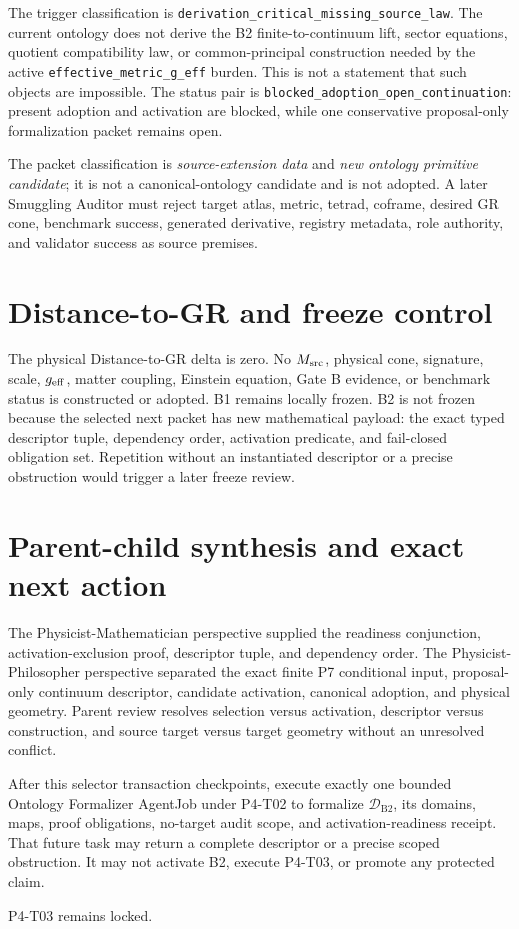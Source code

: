 \documentclass[11pt]{article}
\newcommand{\Btwo}{\mathrm{B2}}
\newcommand{\Desc}{\mathcal{D}_{\Btwo}}
\begin{document}
The trigger classification is
\texttt{derivation\_critical\_missing\_source\_law}. The current ontology
does not derive the B2 finite-to-continuum lift, sector equations, quotient
compatibility law, or common-principal construction needed by the active
\texttt{effective\_metric\_g\_eff} burden. This is not a statement that such
objects are impossible. The status pair is
\texttt{blocked\_adoption\_open\_continuation}: present adoption and
activation are blocked, while one conservative proposal-only formalization
packet remains open.

The packet classification is \emph{source-extension data} and
\emph{new ontology primitive candidate}; it is not a canonical-ontology
candidate and is not adopted. A later Smuggling Auditor must reject target
atlas, metric, tetrad, coframe, desired GR cone, benchmark success, generated
derivative, registry metadata, role authority, and validator success as
source premises.

\section{Distance-to-GR and freeze control}

The physical Distance-to-GR delta is zero. No $M_{\rm src}$, physical cone,
signature, scale, $g_{\rm eff}$, matter coupling, Einstein equation, Gate B
evidence, or benchmark status is constructed or adopted. B1 remains locally
frozen. B2 is not frozen because the selected next packet has new mathematical
payload: the exact typed descriptor tuple, dependency order, activation
predicate, and fail-closed obligation set. Repetition without an instantiated
descriptor or a precise obstruction would trigger a later freeze review.

\section{Parent-child synthesis and exact next action}

The Physicist-Mathematician perspective supplied the readiness conjunction,
activation-exclusion proof, descriptor tuple, and dependency order. The
Physicist-Philosopher perspective separated the exact finite P7 conditional
input, proposal-only continuum descriptor, candidate activation, canonical
adoption, and physical geometry. Parent review resolves selection versus
activation, descriptor versus construction, and source target versus target
geometry without an unresolved conflict.

\enlargethispage{3\baselineskip}
After this selector transaction checkpoints, execute exactly one bounded
Ontology Formalizer AgentJob under P4-T02 to formalize $\Desc$, its domains,
maps, proof obligations, no-target audit scope, and activation-readiness
receipt. That future task may return a complete descriptor or a precise scoped
obstruction. It may not activate B2, execute P4-T03, or promote any protected
claim.

P4-T03 remains locked.
\end{document}
